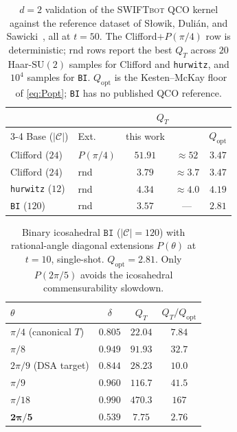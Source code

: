 \documentclass[twocolumn,superscriptaddress,showpacs,nofootinbib,notitlepage,preprintnumbers,secnumarabic,amssymb, nobibnotes, aps, prd]{revtex4-2}
\let\origtoprule\toprule
\let\origbottomrule\bottomrule
\renewcommand{\toprule}{\origtoprule\origtoprule}%
\renewcommand{\bottomrule}{\origbottomrule\origbottomrule}%
\newcommand{\QT}{Q_{T}}              %
\newcommand{\Popt}{Q_{\mathrm{opt}}} %
\newcommand{\SWIFTbot}{\textsc{SWIFTbot}\xspace}
\begin{document}
\begin{table}[t]
\centering
\caption{\label{tab:d2_validation}$d=2$ validation of the \SWIFTbot QCO kernel against the reference dataset of S{\l}owik, Duli{\'a}n, and Sawicki~\cite{Slowik:2025qco}, all at $t=50$. The Clifford$+P(\pi/4)$ row is deterministic; rnd rows report the best $\QT$ across $20$ Haar-$\mathrm{SU}(2)$ samples for Clifford and \texttt{hurwitz}, and $10^4$ samples for \texttt{BI}. $\Popt$ is the Kesten--McKay floor of \cref{eq:Popt}; \texttt{BI} has no published QCO reference.}
\begin{tabular}{@{}llccc@{}}
\toprule
                    &           & \multicolumn{2}{c}{$\QT$} & \\
\cmidrule(lr){3-4}
Base ($|\mathcal{C}|$) & Ext.   & this work & \cite{Slowik:2025qco} & $\Popt$ \\
\midrule
Clifford ($24$)         & $P(\pi/4)$ & $51.91$ & $\approx 52$  & $3.47$ \\
Clifford ($24$)         & rnd        & $3.79$  & $\approx 3.7$ & $3.47$ \\
\texttt{hurwitz} ($12$) & rnd        & $4.34$  & $\approx 4.0$ & $4.19$ \\
\texttt{BI} ($120$)     & rnd        & $3.57$  & ---           & $2.81$ \\
\bottomrule
\end{tabular}
\end{table}

\begin{table}[t]
\centering
\caption{\label{tab:bi_diag}Binary icosahedral $\texttt{BI}$ ($|\mathcal{C}|=120$) with rational-angle diagonal extensions $P(\theta)$ at $t=10$, single-shot. $\Popt = 2.81$. Only $P(2\pi/5)$ avoids the icosahedral commensurability slowdown.}
\begin{tabular}{@{}lccc@{}}
\toprule
$\theta$ & $\delta$ & $\QT$ & $\QT/\Popt$ \\
\midrule
$\pi/4$ (canonical $T$)  & $0.805$ & $22.04$  & $7.84$ \\
$\pi/8$                  & $0.949$ & $91.93$  & $32.7$ \\
$2\pi/9$ (DSA target)    & $0.844$ & $28.23$  & $10.0$ \\
$\pi/9$                  & $0.960$ & $116.7$  & $41.5$ \\
$\pi/18$                 & $0.990$ & $470.3$  & $167$ \\
$\boldsymbol{2\pi/5}$    & $\mathbf{0.539}$ & $\mathbf{7.75}$ & $\mathbf{2.76}$ \\
\bottomrule
\end{tabular}
\end{table}
\end{document}
